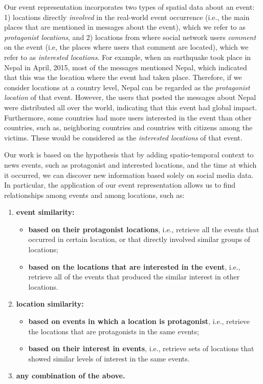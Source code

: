 Our event representation incorporates two types of spatial data about an event:
%
1) locations directly {\em involved} in the real-world event occurrence (i.e.,
the main places that are mentioned in messages about the event), which we refer
to as {\em protagonist locations}, and 
%
2) locations from where social network users {\em comment} on the event (i.e,
the places where users that comment are located), which we refer to as {\em
interested locations}.  
%
For example, when an earthquake took place in Nepal in April, 2015, most of the
messages mentioned Nepal, which indicated that this was the location where the
event had taken place. 
%
Therefore, if we consider locations at a country level, Nepal can be regarded as
the {\em protagonist location} of that event. 
%
However, the users that posted the messages about Nepal were distributed all
over the world, indicating that this event had global impact. 
%
Furthermore, some countries had more users interested in the event than other
countries, such as, neighboring countries and countries with citizens among the
victims.  
%
These would be considered as the {\em interested locations} of that event.


Our work is based on the hypothesis that by adding spatio-temporal context to
news events, such as protagonist and interested locations, and the time at which
it occurred, we can discover new information based solely on social media data.
%
In particular, the application of our event representation allows us to find
relationships among events and among locations, such as:

\begin{enumerate}
\item{\bf event similarity:}
  \begin{itemize}
  \item {\bf based on their protagonist locations}, i.e., retrieve all the
    events that occurred in certain location, or that directly involved similar
    groups of locations;
  \item {\bf based on the locations that are interested in the event}, i.e.,
    retrieve all of the events that produced the similar interest in other
    locations.
  \end{itemize}
\item{\bf location similarity:}
  \begin{itemize}
  \item {\bf based on events in which a location is protagonist}, i.e., retrieve
the locations that are protagonists in the same events;
  \item {\bf based on their interest in events}, i.e.,  retrieve sets of
locations that showed similar levels of interest in the same events.
  \end{itemize}
\item{\bf any combination of the above.}
\end{enumerate}

